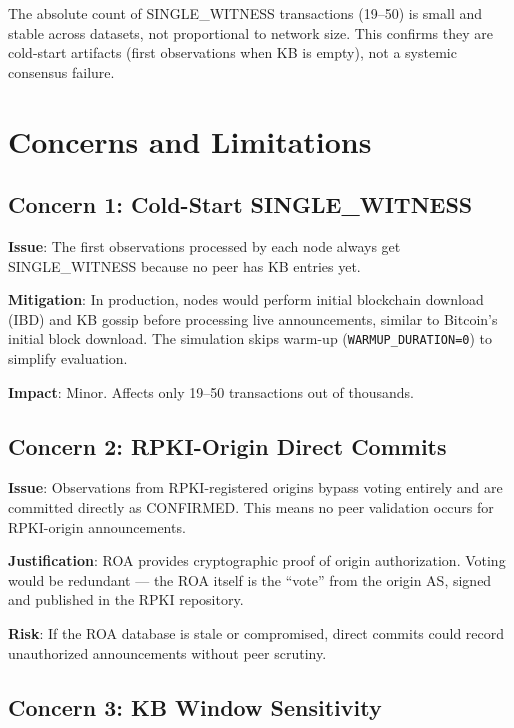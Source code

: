 \documentclass[11pt,a4paper]{article}
\begin{document}
The absolute count of SINGLE\_WITNESS transactions (19--50) is small and stable
across datasets, not proportional to network size. This confirms they are
cold-start artifacts (first observations when KB is empty), not a systemic
consensus failure.

\section{Concerns and Limitations}

\subsection{Concern 1: Cold-Start SINGLE\_WITNESS}

\textbf{Issue}: The first observations processed by each node always get
SINGLE\_WITNESS because no peer has KB entries yet.

\textbf{Mitigation}: In production, nodes would perform initial blockchain
download (IBD) and KB gossip before processing live announcements, similar
to Bitcoin's initial block download. The simulation skips warm-up
(\texttt{WARMUP\_DURATION=0}) to simplify evaluation.

\textbf{Impact}: Minor. Affects only 19--50 transactions out of thousands.

\subsection{Concern 2: RPKI-Origin Direct Commits}

\textbf{Issue}: Observations from RPKI-registered origins bypass voting entirely
and are committed directly as CONFIRMED. This means no peer validation occurs
for RPKI-origin announcements.

\textbf{Justification}: ROA provides cryptographic proof of origin authorization.
Voting would be redundant --- the ROA itself is the ``vote'' from the origin AS,
signed and published in the RPKI repository.

\textbf{Risk}: If the ROA database is stale or compromised, direct commits
could record unauthorized announcements without peer scrutiny.

\subsection{Concern 3: KB Window Sensitivity}
\end{document}
